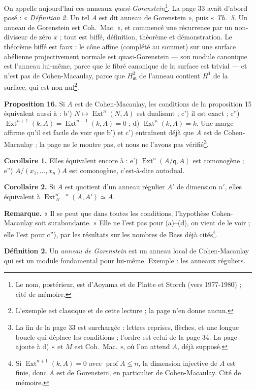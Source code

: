 \documentclass[11pt,a4paper]{article}
\begin{document}
On appelle aujourd'hui ces anneaux \emph{quasi-Gorenstein}\footnote{Le nom,
postérieur, est d'Aoyama et de Platte et Storch (vers 1977-1980) ; cité de
mémoire.}. La page 33 avait d'abord posé : « \emph{Définition 2.} Un tel $A$
est dit anneau de Gorenstein », puis « \emph{Th.\ 5.} Un anneau de Gorenstein
est Coh.\ Mac. », et commencé une récurrence par un non-diviseur de zéro $x$ ;
tout est biffé, définition, théorème et démonstration. Le théorème biffé est
faux : le cône affine (complété au sommet) sur une surface abélienne
projectivement normale est quasi-Gorenstein --- son module canonique est
l'anneau lui-même, parce que le fibré canonique de la surface est trivial ---
et n'est pas de Cohen-Macaulay, parce que $H^2_{\mathfrak{m}}$ de l'anneau
contient $H^1$ de la surface, qui est non nul\footnote{L'exemple est classique
et de cette lecture ; la page n'en donne aucun.}.

\textbf{Proposition 16.} Si $A$ est de Cohen-Macaulay, les conditions de la
proposition 15 équivalent aussi à : b') $N \mapsto \operatorname{Ext}^n(N, A)$
est dualisant ; c') il est exact ; c'') $\operatorname{Ext}^{n+1}(k, A) =
\operatorname{Ext}^{n-1}(k, A) = 0$ ; d) $\operatorname{Ext}^n(k, A) = k$. Une
marge affirme qu'il est facile de voir que b') et c') entraînent déjà que $A$
est de Cohen-Macaulay ; la page ne le montre pas, et nous ne l'avons pas
vérifié\footnote{La fin de la page 33 est surchargée : lettres reprises,
flèches, et une longue boucle qui déplace les conditions ; l'ordre est celui
de la page 34. La page ajoute à d) « et $M$ est Coh.\ Mac. », où l'on attend
$A$, déjà supposé.}.

\textbf{Corollaire 1.} Elles équivalent encore à : e') $\operatorname{Ext}^n(A/
\mathfrak{q}, A)$ est comonogène ; e'') $A/(x_1, \ldots, x_n)A$ est comonogène,
c'est-à-dire autodual.

\textbf{Corollaire 2.} Si $A$ est quotient d'un anneau régulier $A'$ de
dimension $n'$, elles équivalent à $\operatorname{Ext}^{n'-n}_{A'}(A, A') \simeq
A$.

\textbf{Remarque.} « Il se peut que dans toutes les conditions, l'hypothèse
Cohen-Macaulay soit surabondante. » Elle ne l'est pas pour (a)--(d), on vient
de le voir ; elle l'est pour c''), par les résultats sur les nombres de Bass
déjà cités\footnote{Si $\operatorname{Ext}^{n+1}(k, A) = 0$ avec
$\operatorname{prof} A \leqslant n$, la dimension injective de $A$ est finie,
donc $A$ est de Gorenstein, en particulier de Cohen-Macaulay. Cité de
mémoire.}.

\textbf{Définition 2.} Un \emph{anneau de Gorenstein} est un anneau local de
Cohen-Macaulay qui est un module fondamental pour lui-même. Exemple : les
anneaux réguliers.
\end{document}
